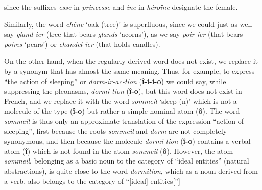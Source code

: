 \begin{sloppypar}
{{    
    \noindent
    since the suffixes \emph{esse} in \emph{princesse} and \emph{ine}
    in \emph{héroïne} designate the female.

    Similarly, the word \emph{chêne} `oak (tree)' is superfluous,
    since we could just as well say \emph{gland-ier} (tree that bears
    \emph{glands} `acorns'), as we say \emph{poir-ier} (that bears
    \emph{poires} `pears') or \emph{chandel-ier} (that holds candles).

    On the other hand, when the regularly derived word does not exist,
    we replace it by a synonym that has almost the same meaning.
    Thus, for example, to express ``the action of sleeping'' or
    \emph{dorm-ir-ac-tion} (\textbf{î-i-i-o}) we could say, while
    suppressing the pleonasms, \emph{dormi-tion} (\textbf{î-o}), but this
    word does not exist in French, and we replace it with the word
    \emph{sommeil} `sleep (n)' which is not a molecule of the type
    (\textbf{î-o}) but rather a simple nominal atom
    (\textbf{ô}). The word \emph{sommeil} is thus only an approximate
    translation of the expression ``action of sleeping'', first
    because the roots \emph{sommeil} and \emph{dorm} are not completely
    synonymous, and then because the molecule \emph{dormi-tion}
    (\textbf{î-o}) contains a verbal atom (\textbf{î}) which is not
    found in the atom \emph{sommeil} (\textbf{ô}). However, the atom
    \emph{sommeil}, belonging as a basic noun to the category of ``ideal
    entities'' (natural abstractions), is quite close to the word
    \emph{dormition}, which as a noun derived from a verb, also belongs
    to the category of ``[ideal] entities['']


  } }

\end{sloppypar}
